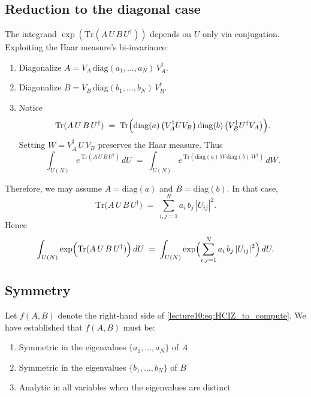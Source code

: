 \documentclass[letterpaper,11pt,oneside,reqno]{book}
\numberwithin{equation}{chapter}  %
\theoremstyle{definition}
\begin{document}
\subsection{Reduction to the diagonal case}

The integrand \(\exp(\mathrm{Tr}(A\,U\,B\,U^\dagger))\) depends on \(U\) only via conjugation.  Exploiting the Haar measure's bi-invariance:

\begin{enumerate}
   \item Diagonalize \(A = V_A\,\mathrm{diag}(a_1,\dots,a_N)\,V_A^\dagger\).
   \item Diagonalize \(B = V_B\,\mathrm{diag}(b_1,\dots,b_N)\,V_B^\dagger\).
   \item Notice
   \[
      \mathrm{Tr}(A\,U\,B\,U^\dagger)
      \;=\;
      \mathrm{Tr}\Bigl(\mathrm{diag}(a)\,\bigl(V_A^\dagger U V_B\bigr)\,\mathrm{diag}(b)\,\bigl(V_B^\dagger U^\dagger V_A\bigr)\Bigr).
   \]
   Setting \(W=V_A^\dagger\,U\,V_B\) preserves the Haar measure.  Thus
   \[
      \int_{U(N)} e^{\,\mathrm{Tr}(A\,U\,B\,U^\dagger)}\,dU
      \;=\;
      \int_{U(N)}
      e^{\,\mathrm{Tr}(\mathrm{diag}(a)\,W\,\mathrm{diag}(b)\,W^\dagger)}\,dW.
   \]
\end{enumerate}
Therefore, we may assume \(A=\mathrm{diag}(a)\) and \(B=\mathrm{diag}(b)\).  In that case,
\[
   \mathrm{Tr}\bigl(A\,U\,B\,U^\dagger\bigr)
   \;=\;
   \sum_{i,j=1}^N a_i\,b_j\,|U_{ij}|^2.
\]
Hence
\begin{equation}
	\label{lecture10:eq:HCIZ_to_compute}
   \int_{U(N)}
   \exp\Bigl(\mathrm{Tr}(A\,U\,B\,U^\dagger)\Bigr)\,dU
   \;=\;
   \int_{U(N)}
   \exp\Bigl(\sum_{i,j=1}^N a_i\,b_j\,|U_{ij}|^2\Bigr)\,dU.
 \end{equation}

\subsection{Symmetry}

Let \(f(A,B)\) denote the
right-hand side of \eqref{lecture10:eq:HCIZ_to_compute}.
We have established that $f(A,B)$ must be:
\begin{enumerate}
   \item Symmetric in the eigenvalues $\{a_1,\ldots,a_N\}$ of $A$
   \item Symmetric in the eigenvalues $\{b_1,\ldots,b_N\}$ of $B$
   \item Analytic in all variables when the eigenvalues are distinct
\end{enumerate}
\end{document}
